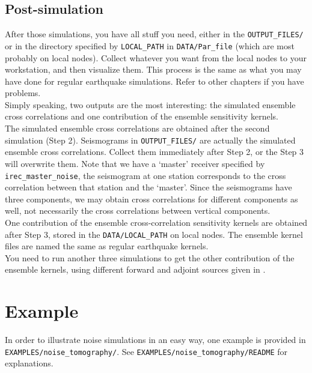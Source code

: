\subsection{Post-simulation}

After those simulations, you have all stuff you need, either in the
\texttt{OUTPUT\_FILES/} or in the directory specified by \texttt{LOCAL\_PATH}
in \texttt{DATA/Par\_file} (which are most probably on local nodes).
Collect whatever you want from the local nodes to your workstation,
and then visualize them. This process is the same as what you may
have done for regular earthquake simulations. Refer to other chapters
if you have problems.\\


Simply speaking, two outputs are the most interesting: the simulated
ensemble cross correlations and one contribution of the ensemble sensitivity
kernels.\\


The simulated ensemble cross correlations are obtained after the second
simulation (Step 2). Seismograms in \texttt{OUTPUT\_FILES/} are actually
the simulated ensemble cross correlations. Collect them immediately
after Step 2, or the Step 3 will overwrite them. Note that we have
a `master' receiver specified by \texttt{irec\_master\_noise}, the
seismogram at one station corresponds to the cross correlation between
that station and the `master'. Since the seismograms have three components,
we may obtain cross correlations for different components as well,
not necessarily the cross correlations between vertical components.\\


One contribution of the ensemble cross-correlation sensitivity kernels
are obtained after Step 3, stored in the \texttt{DATA/LOCAL\_PATH}
on local nodes. The ensemble kernel files are named the same as regular
earthquake kernels.\\


You need to run another three simulations to get the other contribution
of the ensemble kernels, using different forward and adjoint sources
given in \citet{trompetal2010}.


\section{Example}

In order to illustrate noise simulations in an easy way, one example
is provided in \texttt{EXAMPLES/noise\_tomography/}. See \texttt{EXAMPLES/noise\_tomography/README}
for explanations. \\


